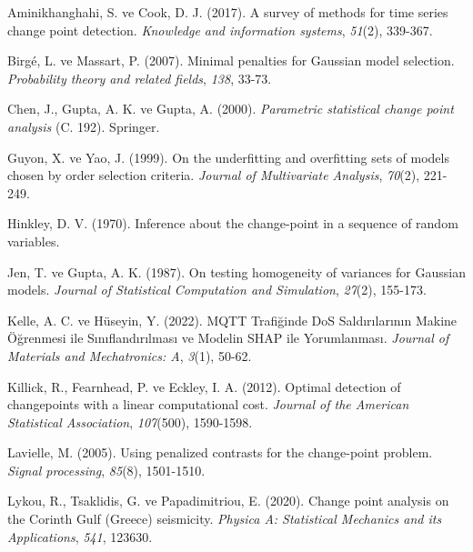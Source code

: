 \documentclass[12pt,twoside]{deuthesis}
\begin{document}

\label{refs}
\begin{CSLReferences}{1}{0}
Aminikhanghahi, S. ve Cook, D. J. (2017). A survey of methods for time series change point detection. \emph{Knowledge and information systems}, \emph{51}(2), 339-367.

Birgé, L. ve Massart, P. (2007). Minimal penalties for Gaussian model selection. \emph{Probability theory and related fields}, \emph{138}, 33-73.

Chen, J., Gupta, A. K. ve Gupta, A. (2000). \emph{Parametric statistical change point analysis} (C. 192). Springer.

Guyon, X. ve Yao, J. (1999). On the underfitting and overfitting sets of models chosen by order selection criteria. \emph{Journal of Multivariate Analysis}, \emph{70}(2), 221-249.

Hinkley, D. V. (1970). Inference about the change-point in a sequence of random variables.

Jen, T. ve Gupta, A. K. (1987). On testing homogeneity of variances for Gaussian models. \emph{Journal of Statistical Computation and Simulation}, \emph{27}(2), 155-173.

Kelle, A. C. ve Hüseyin, Y. (2022). MQTT Trafi{ğ}inde DoS Sald{ı}r{ı}lar{ı}n{ı}n Makine {Ö}{ğ}renmesi ile S{ı}n{ı}fland{ı}r{ı}lmas{ı} ve Modelin SHAP ile Yorumlanmas{ı}. \emph{Journal of Materials and Mechatronics: A}, \emph{3}(1), 50-62.

Killick, R., Fearnhead, P. ve Eckley, I. A. (2012). Optimal detection of changepoints with a linear computational cost. \emph{Journal of the American Statistical Association}, \emph{107}(500), 1590-1598.

Lavielle, M. (2005). Using penalized contrasts for the change-point problem. \emph{Signal processing}, \emph{85}(8), 1501-1510.

Lykou, R., Tsaklidis, G. ve Papadimitriou, E. (2020). Change point analysis on the Corinth Gulf (Greece) seismicity. \emph{Physica A: Statistical Mechanics and its Applications}, \emph{541}, 123630.


\end{CSLReferences}
\end{document}
